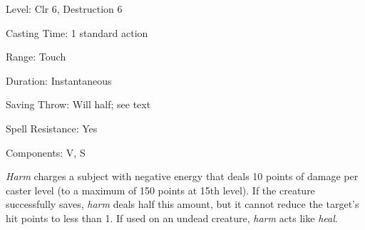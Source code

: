 
\begin{description*}
\item[Level:] Clr 6, Destruction 6
\item[Casting Time:] 1 standard action
\item[Range:] Touch
\item[Duration:] Instantaneous
\item[Saving Throw:] Will half; see text
\item[Spell Resistance:] Yes
\item[Components:] V, S
\end{description*}

\textit{Harm} charges a subject with negative energy that deals 10 points of damage
per caster level (to a maximum of 150 points at 15th level). If the creature successfully
saves, \textit{harm} deals half this amount, but it cannot reduce the target's
hit points to less than 1.
If used on an undead creature, \textit{harm} acts like \textit{heal}.